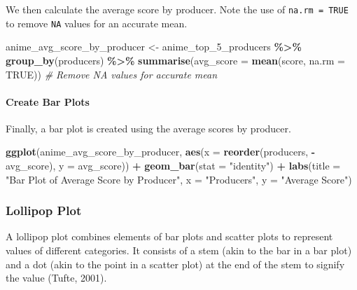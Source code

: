 \documentclass[
]{book}
\newenvironment{Shaded}{\begin{snugshade}}{\end{snugshade}}
\newcommand{\AttributeTok}[1]{\textcolor[rgb]{0.13,0.29,0.53}{#1}}
\newcommand{\CommentTok}[1]{\textcolor[rgb]{0.56,0.35,0.01}{\textit{#1}}}
\newcommand{\ConstantTok}[1]{\textcolor[rgb]{0.56,0.35,0.01}{#1}}
\newcommand{\FunctionTok}[1]{\textcolor[rgb]{0.13,0.29,0.53}{\textbf{#1}}}
\newcommand{\NormalTok}[1]{#1}
\newcommand{\OtherTok}[1]{\textcolor[rgb]{0.56,0.35,0.01}{#1}}
\newcommand{\SpecialCharTok}[1]{\textcolor[rgb]{0.81,0.36,0.00}{\textbf{#1}}}
\newcommand{\StringTok}[1]{\textcolor[rgb]{0.31,0.60,0.02}{#1}}
\begin{document}
We then calculate the average score by producer. Note the use of \texttt{na.rm\ =\ TRUE} to remove \texttt{NA} values for an accurate mean.

\begin{Shaded}
\begin{Highlighting}[]
\NormalTok{anime\_avg\_score\_by\_producer }\OtherTok{\textless{}{-}}\NormalTok{ anime\_top\_5\_producers }\SpecialCharTok{\%\textgreater{}\%}
  \FunctionTok{group\_by}\NormalTok{(producers) }\SpecialCharTok{\%\textgreater{}\%}
  \FunctionTok{summarise}\NormalTok{(}\AttributeTok{avg\_score =} \FunctionTok{mean}\NormalTok{(score, }\AttributeTok{na.rm =} \ConstantTok{TRUE}\NormalTok{))  }\CommentTok{\# Remove NA values for accurate mean}
\end{Highlighting}
\end{Shaded}

\hypertarget{create-bar-plots}{%
\paragraph*{Create Bar Plots}\label{create-bar-plots}}

Finally, a bar plot is created using the average scores by producer.

\begin{Shaded}
\begin{Highlighting}[]
\FunctionTok{ggplot}\NormalTok{(anime\_avg\_score\_by\_producer, }\FunctionTok{aes}\NormalTok{(}\AttributeTok{x =} \FunctionTok{reorder}\NormalTok{(producers, }\SpecialCharTok{{-}}\NormalTok{avg\_score), }\AttributeTok{y =}\NormalTok{ avg\_score)) }\SpecialCharTok{+}
  \FunctionTok{geom\_bar}\NormalTok{(}\AttributeTok{stat =} \StringTok{"identity"}\NormalTok{) }\SpecialCharTok{+}
  \FunctionTok{labs}\NormalTok{(}\AttributeTok{title =} \StringTok{"Bar Plot of Average Score by Producer"}\NormalTok{,}
       \AttributeTok{x =} \StringTok{"Producers"}\NormalTok{,}
       \AttributeTok{y =} \StringTok{"Average Score"}\NormalTok{)}
\end{Highlighting}
\end{Shaded}

\hypertarget{lollipop-plot}{%
\subsubsection*{Lollipop Plot}\label{lollipop-plot}}

A lollipop plot combines elements of bar plots and scatter plots to represent values of different categories. It consists of a stem (akin to the bar in a bar plot) and a dot (akin to the point in a scatter plot) at the end of the stem to signify the value (Tufte, 2001).
\end{document}
